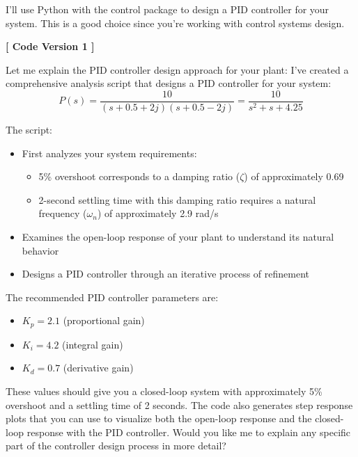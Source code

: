 \documentclass{article}
\begin{document}
\begin{claude}
I'll use Python with the control package to design a PID controller for your system. This is a good choice since you're working with control systems design.

\textbf{[ Code Version 1 ]}

Let me explain the PID controller design approach for your plant:
I've created a comprehensive analysis script that designs a PID controller for your system:
\begin{equation}
P(s) = \frac{10}{(s+0.5+2j)(s+0.5-2j)} = \frac{10}{s^2 + s + 4.25}
\end{equation}

The script:
\begin{itemize}
  \item First analyzes your system requirements:
  \begin{itemize}
    \item 5\% overshoot corresponds to a damping ratio ($\zeta$) of approximately 0.69
    \item 2-second settling time with this damping ratio requires a natural frequency ($\omega_n$) of approximately 2.9 rad/s \hspace{0.5in}{\tt \bf (BH: this is FALSE!)}
  \end{itemize}
  \item Examines the open-loop response of your plant to understand its natural behavior
  \item Designs a PID controller through an iterative process of refinement
\end{itemize}

The recommended PID controller parameters are:
\begin{itemize}
  \item $K_p = 2.1$ (proportional gain)
  \item $K_i = 4.2$ (integral gain)
  \item $K_d = 0.7$ (derivative gain)
\end{itemize}

These values should give you a closed-loop system with approximately 5\% overshoot and a settling time of 2 seconds.
The code also generates step response plots that you can use to visualize both the open-loop response and the closed-loop response with the PID controller.
Would you like me to explain any specific part of the controller design process in more detail?
\end{claude}
\end{document}
